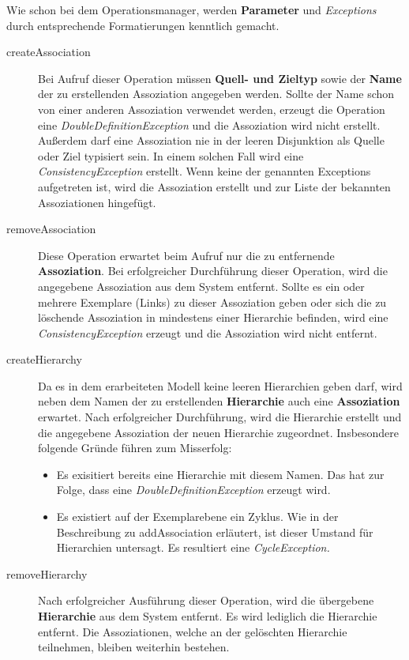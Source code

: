 Wie schon bei dem Operationsmanager, werden \textbf{Parameter} und \emph{Exceptions} durch entsprechende Formatierungen kenntlich gemacht.

\begin{description}
\item[createAssociation] Bei Aufruf dieser Operation müssen \textbf{Quell- und Zieltyp} sowie der \textbf{Name} der zu erstellenden Assoziation 
angegeben werden.
Sollte der Name schon von einer anderen Assoziation verwendet werden, erzeugt die Operation eine \emph{DoubleDefinitionException} und die Assoziation wird nicht
erstellt. Außerdem darf eine Assoziation nie in der leeren Disjunktion als Quelle oder Ziel typisiert sein. In einem solchen Fall
wird eine \emph{ConsistencyException} erstellt.
Wenn keine der genannten Exceptions aufgetreten ist, wird die Assoziation erstellt und zur Liste der bekannten Assoziationen hingefügt. 
\item[removeAssociation] Diese Operation erwartet beim Aufruf nur die zu entfernende \textbf{Assoziation}. 
Bei erfolgreicher Durchführung dieser Operation, wird die
angegebene Assoziation aus dem System entfernt.
Sollte es ein oder mehrere Exemplare (Links) zu dieser Assoziation geben oder sich die zu löschende Assoziation in mindestens einer Hierarchie befinden, wird eine \emph{ConsistencyException} erzeugt und die Assoziation wird nicht entfernt. 
\item[createHierarchy] Da es in dem erarbeiteten Modell keine leeren Hierarchien geben darf, wird neben dem Namen der zu erstellenden \textbf{Hierarchie} auch eine 
\textbf{Assoziation} erwartet. Nach erfolgreicher Durchführung, wird die Hierarchie erstellt und die angegebene Assoziation der neuen Hierarchie zugeordnet.
Insbesondere folgende Gründe führen zum Misserfolg:
\begin{itemize}
\item Es exisitiert bereits eine Hierarchie mit diesem Namen. Das hat zur Folge, dass eine \emph{DoubleDefinitionException} erzeugt wird.
\item Es existiert auf der Exemplarebene ein Zyklus. Wie in der Beschreibung zu addAssociation erläutert, ist dieser Umstand für Hierarchien untersagt.
 Es resultiert eine \emph{CycleException.}
\end{itemize}
\item[removeHierarchy] Nach erfolgreicher Ausführung dieser Operation, wird die übergebene \textbf{Hierarchie} aus dem System entfernt. 
Es wird lediglich die Hierarchie entfernt. Die Assoziationen, welche an der gelöschten Hierarchie teilnehmen, bleiben weiterhin bestehen.

\end{description}
